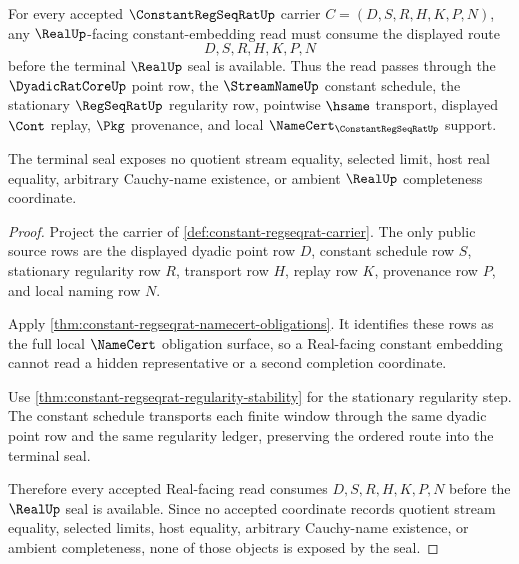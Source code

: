 \begin{theorem}
\label{thm:constant-regseqrat-real-seal-nonescape}
For every accepted $\ConstantRegSeqRatUp$ carrier $C=(D,S,R,H,K,P,N)$, any $\RealUp$-facing constant-embedding read must consume the displayed route
$$
D,S,R,H,K,P,N
$$
before the terminal $\RealUp$ seal is available. Thus the read passes through the $\DyadicRatCoreUp$ point row, the $\StreamNameUp$ constant schedule, the stationary $\RegSeqRatUp$ regularity row, pointwise $\hsame$ transport, displayed $\Cont$ replay, $\Pkg$ provenance, and local $\NameCert_{\ConstantRegSeqRatUp}$ support.

The terminal seal exposes no quotient stream equality, selected limit, host real equality, arbitrary Cauchy-name existence, or ambient $\RealUp$ completeness coordinate.
\end{theorem}
\begin{proof}
Project the carrier of \autoref{def:constant-regseqrat-carrier}. The only public source rows are the displayed dyadic point row $D$, constant schedule row $S$, stationary regularity row $R$, transport row $H$, replay row $K$, provenance row $P$, and local naming row $N$.

Apply \autoref{thm:constant-regseqrat-namecert-obligations}. It identifies these rows as the full local $\NameCert$ obligation surface, so a Real-facing constant embedding cannot read a hidden representative or a second completion coordinate.

Use \autoref{thm:constant-regseqrat-regularity-stability} for the stationary regularity step. The constant schedule transports each finite window through the same dyadic point row and the same regularity ledger, preserving the ordered route into the terminal seal.

Therefore every accepted Real-facing read consumes $D,S,R,H,K,P,N$ before the $\RealUp$ seal is available. Since no accepted coordinate records quotient stream equality, selected limits, host equality, arbitrary Cauchy-name existence, or ambient completeness, none of those objects is exposed by the seal.
\end{proof}


